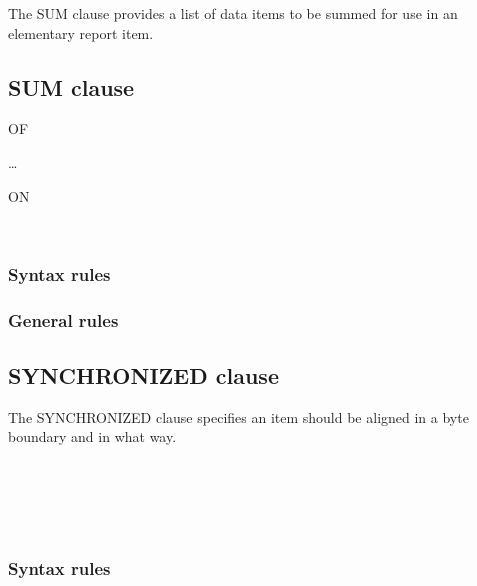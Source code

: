The SUM clause provides a list of data items to be summed for use in an elementary report item.

\subsection{SUM clause}
\begin{syntax}
   OF
  \begin{1=}
  \end{1=}\ldots
  \begin{0-1}
     ON
    \begin{1=}
      \identifier \\
    \end{1=}
  \end{0-1}
\end{syntax}

\subsubsection{Syntax rules}

\subsubsection{General rules}

\subsection{SYNCHRONIZED clause}

The SYNCHRONIZED clause specifies an item should be aligned in a byte boundary and in what way.

\begin{syntax}
  \begin{1=}
     \\
     \\
  \end{1=}
  \begin{0-1}
     \\
  \end{0-1}
\end{syntax}

\subsubsection{Syntax rules}

